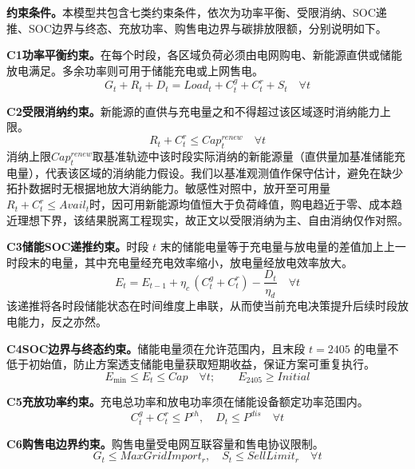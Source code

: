 \medskip\noindent\textbf{约束条件。}本模型共包含七类约束条件，依次为功率平衡、受限消纳、SOC递推、SOC边界与终态、充放功率、购售电边界与碳排放限额，分别说明如下。

\textbf{C1\quad 功率平衡约束。}在每个时段，各区域负荷必须由电网购电、新能源直供或储能放电满足。多余功率则可用于储能充电或上网售电。
\begin{equation}
G_t + R_t + D_t = Load_t + C^g_t + C^r_t + S_t \quad \forall t
\end{equation}

\textbf{C2\quad 受限消纳约束。}新能源的直供与充电量之和不得超过该区域逐时消纳能力上限。
\begin{equation}
R_t + C^r_t \le Cap^{renew}_t \quad \forall t
\end{equation}
消纳上限$Cap^{renew}_t$取基准轨迹中该时段实际消纳的新能源量（直供量加基准储能充电量），代表该区域的消纳能力假设。我们以基准观测值作保守估计，避免在缺少拓扑数据时无根据地放大消纳能力。敏感性对照中，放开至可用量$R_t+C^r_t\le Avail_t$时，因可用新能源均值恒大于负荷峰值，购电趋近于零、成本趋近理想下界，该结果脱离工程现实，故正文以受限消纳为主、自由消纳仅作对照。

\textbf{C3\quad 储能SOC递推约束。}时段 $t$ 末的储能电量等于充电量与放电量的差值加上上一时段末的电量，其中充电量经充电效率缩小，放电量经放电效率放大。
\begin{equation}
E_t = E_{t-1} + \eta_c\,(C^g_t + C^r_t) - \frac{D_t}{\eta_d} \quad \forall t
\end{equation}
该递推将各时段储能状态在时间维度上串联，从而使当前充电决策提升后续时段放电能力，反之亦然。

\textbf{C4\quad SOC边界与终态约束。}储能电量须在允许范围内，且末段 $t=2405$ 的电量不低于初始值，防止方案透支储能电量获取短期收益，保证方案可重复执行。
\begin{equation}
E_{\min} \le E_t \le Cap \quad \forall t; \qquad E_{2405} \ge Initial
\end{equation}

\textbf{C5\quad 充放功率约束。}充电总功率和放电功率须在储能设备额定功率范围内。
\begin{equation}
C^g_t + C^r_t \le P^{ch},\quad D_t \le P^{dis} \quad \forall t
\end{equation}

\textbf{C6\quad 购售电边界约束。}购售电量受电网互联容量和售电协议限制。
\begin{equation}
G_t \le MaxGridImport_r,\quad S_t \le SellLimit_r \quad \forall t
\end{equation}

